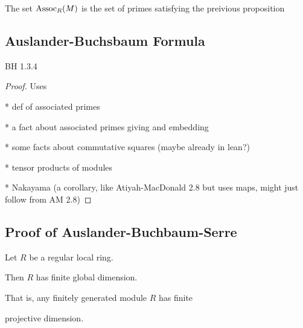 \begin{definition}
  \label{def:assoc_primes}
  The set $\text{Assoc}_R (M)$ is the set of
  primes satisfying the preivious proposition
\end{definition}

\subsection{Auslander-Buchsbaum Formula}

\begin{lemma}
  \label{lem:module_assoc_maximal_tensor_free_summand}
  BH 1.3.4
\end{lemma}

\begin{proof}
  Uses

  * def of associated primes

  * a fact about associated primes giving and embedding

  * some facts about commutative squares (maybe already in lean?)

  * tensor products of modules

  * Nakayama (a corollary, like Atiyah-MacDonald 2.8 
    but uses maps, might just follow from AM 2.8)
\end{proof}





\subsection{Proof of Auslander-Buchbaum-Serre}



\begin{lemma}

  \label{lem:reg_implies_finite_global}


  Let $R$ be a regular local ring.

  Then $R$ has finite global dimension.

  That is, any finitely generated module $R$ has finite

  projective dimension.

\end{lemma}




